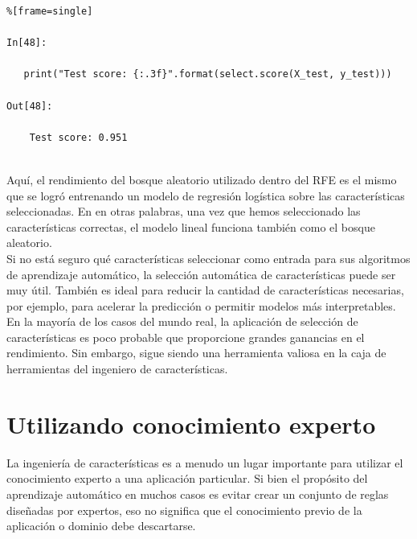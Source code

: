 \begin{lstlisting}%[frame=single]

In[48]:

   print("Test score: {:.3f}".format(select.score(X_test, y_test)))

Out[48]:

    Test score: 0.951


\end{lstlisting}


Aquí, el rendimiento del bosque aleatorio utilizado dentro del RFE es el mismo que se
logró entrenando un modelo de regresión logística sobre las características seleccionadas. En
en otras palabras, una vez que hemos seleccionado las características correctas, el modelo lineal funciona  también  como el bosque aleatorio.\\

 Si no está seguro qué características  seleccionar  como entrada para sus algoritmos de aprendizaje automático, la selección automática de características puede ser muy útil.  También es ideal para reducir la cantidad de características  necesarias, por ejemplo, para acelerar  la predicción o permitir modelos más interpretables. En la mayoría de los casos del mundo real,  la aplicación de selección de características es  poco probable que proporcione grandes ganancias en el rendimiento. Sin embargo, sigue siendo una herramienta valiosa en la caja de herramientas  del ingeniero de características.
   

\section{Utilizando conocimiento experto}


La ingeniería de características es a menudo un lugar importante para utilizar el conocimiento experto a una   aplicación particular. Si bien el propósito del aprendizaje automático en muchos casos es evitar
 crear un conjunto de reglas diseñadas por expertos, eso no significa que el conocimiento previo de
la aplicación o dominio debe descartarse.

